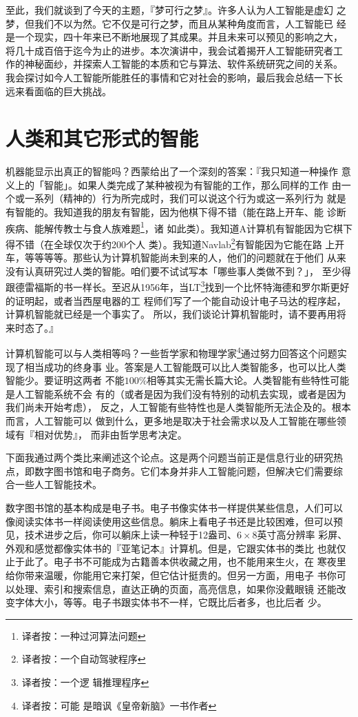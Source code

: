 \documentclass[12pt,a4paper]{article}
\begin{document}
至此，我们就谈到了今天的主题，『梦可行之梦』。许多人认为人工智能是虚幻
之梦，但我们不以为然。它不仅是可行之梦，而且从某种角度而言，人工智能已
经是一个现实，四十年来已不断地展现了其成果。并且未来可以预见的影响之大，
将几十成百倍于迄今为止的进步。本次演讲中，我会试着揭开人工智能研究者工
作的神秘面纱，并探索人工智能的本质和它与算法、软件系统研究之间的关系。
我会探讨如今人工智能所能胜任的事情和它对社会的影响，最后我会总结一下长
远来看面临的巨大挑战。

\section{人类和其它形式的智能}

机器能显示出真正的智能吗？西蒙给出了一个深刻的答案：『我只知道一种操作
意义上的「智能」。如果人类完成了某种被视为有智能的工作，那么同样的工作
由一个或一系列（精神的）行为所完成时，我们可以说这个行为或这一系列行为
就是有智能的。我知道我的朋友有智能，因为他棋下得不错（能在路上开车、能
诊断疾病、能解传教士与食人族难题\footnote{译者按：一种过河算法问题}，诸
如此类）。我知道A计算机有智能因为它棋下得不错（在全球仅次于约200个人
类）。我知道Navlab\footnote{译者按：一个自动驾驶程序}有智能因为它能在路
上开车，等等等等。那些认为计算机智能尚未到来的人，他们的问题就在于他们
从来没有认真研究过人类的智能。咱们要不试试写本「哪些事人类做不到？」，
至少得跟德雷福斯的书一样长。至迟从1956年，当LT\footnote{译者按：一个逻
  辑推理程序}找到一个比怀特海德和罗尔斯更好的证明起，或者当西屋电器的工
程师们写了一个能自动设计电子马达的程序起，计算机智能就已经是一个事实了。
所以，我们谈论计算机智能时，请不要再用将来时态了。』

计算机智能可以与人类相等吗？一些哲学家和物理学家\footnote{译者按：可能
  是暗讽《皇帝新脑》一书作者}通过努力回答这个问题实现了相当成功的终身事
业。答案是人工智能既可以比人类智能多，也可以比人类智能少。要证明这两者
不能$100\%$相等其实无需长篇大论。人类智能有些特性可能是人工智能系统不会
有的（或者是因为我们没有特别的动机去实现，或者是因为我们尚未开始考虑），
反之，人工智能有些特性也是人类智能所无法企及的。根本而言，人工智能可以
做到什么，更多地是取决于社会需求以及人工智能在哪些领域有『相对优势』，
而非由哲学思考决定。

下面我通过两个类比来阐述这个论点。这是两个问题当前正是信息行业的研究热
点，即数字图书馆和电子商务。它们本身并非人工智能问题，但解决它们需要综
合一些人工智能技术。

数字图书馆的基本构成是电子书。电子书像实体书一样提供某些信息，人们可以
像阅读实体书一样阅读使用这些信息。躺床上看电子书还是比较困难，但可以预
见，技术进步之后，你可以躺床上读一种轻于12盎司、$6\times8$英寸高分辨率
彩屏、外观和感觉都像实体书的『亚笔记本』计算机。但是，它跟实体书的类比
也就仅止于此了。电子书不可能成为古籍善本供收藏之用，也不能用来生火，在
寒夜里给你带来温暖，你能用它来打架，但它估计挺贵的。但另一方面，用电子
书你可以处理、索引和搜索信息，直达正确的页面，高亮信息，如果你没戴眼镜
还能改变字体大小，等等。电子书跟实体书不一样，它既比后者多，也比后者
少。
\end{document}
